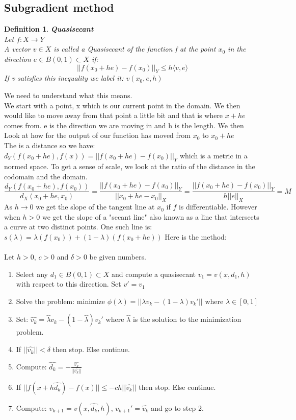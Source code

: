 \documentclass[12pt]{extarticle}
\theoremstyle{plain}
\theoremstyle{plain}
\theoremstyle{plain}
\theoremstyle{Definition}
\newtheorem{def.}{Definition}[section]
\theoremstyle{Definition}
\theoremstyle{plain}
\theoremstyle{plain}
\begin{document}
		\subsection{Subgradient method}
			\begin{def.} \textbf{Quasisecant} \\
				Let $f : X \to Y$ \\ 
				A vector $v \in X$ is called a Quasisecant of the function f at the point $x_0$ in the direction $e \in B(0,1) \subset X$ if: \\ 
				$$||f(x_0+he) - f(x_0)||_Y \leq h\langle v,e \rangle$$
				If v satisfies this inequality we label it: $v(x_0,e,h)$
			\end{def.}
		\noindent
		We need to understand what this means. \\
		We start with a point, x which is our current point in the domain. 
		We then would like to move away from that point a little bit and that is where $x+he$ comes from. 
		e is the direction we are moving in and h is the length. 
		We then Look at how for the output of our function has moved from $x_0$ to $x_0+he$ \\
		The is a distance so we have: $d_Y(f(x_0+he),f(x)) = ||f(x_0+he) - f(x_0)||_Y$ which is a metric in a normed space. 
		To get a sense of scale, we look at the ratio of the distance in the codomain and the domain. 
		$$\frac{d_Y(f(x_0+he),f(x_0))}{d_X(x_0+he,x_0)} = \frac{||f(x_0+he)-f(x_0)||_Y}{||x_0+he - x_0||_X} = \frac{||f(x_0+he)-f(x_0)||_Y}{h||e||_X} = M$$
		As $h \to 0$ we get the slope of the tangent line at $x_0$ if $f$ is differentiable. 
		However when $h > 0$ we get the slope of a "secant line" also known as a line that intersects a curve at two distinct points. 
		One such line is: $s(\lambda) = \lambda(f(x_0)) + (1-\lambda)(f(x_0+he))$
		\newpage
		\noindent
		Here is the method: \\ \\
		Let $h>0$, $c>0$ and $\delta >0$ be given numbers.
		\begin{enumerate}
			\item Select any $d_1 \in B(0,1) \subset X$ and compute a quasisecant $v_1=v(x,d_1,h)$ with respect to this direction. Set $v' = v_1$ 
			\item Solve the problem: minimize $\phi(\lambda) = ||\lambda v_k - (1-\lambda)v_k'||$ where $\lambda \in [0,1]$ 
			\item Set: $\hat{v_k} = \hat{\lambda} v_k - (1-\hat{\lambda})v_k'$ where $\hat{\lambda}$ is the solution to the minimization problem. 
			\item If $||\hat{v_k}|| < \delta$ then stop. Else continue. 
			\item Compute: $\hat{d_k} = -\frac{\hat{v_k}}{||\hat{v_k}||}$
			\item If $||f(x + h\hat{d_k}) - f(x)|| \leq -c h||\hat{v_k}||$ then stop. Else continue. 
			\item Compute: $v_{k+1} = v(x,\hat{d_k},h)$, $v_{k+1}' = \hat{v_k}$ and go to step 2. 
		\end{enumerate}



		
\end{document}
